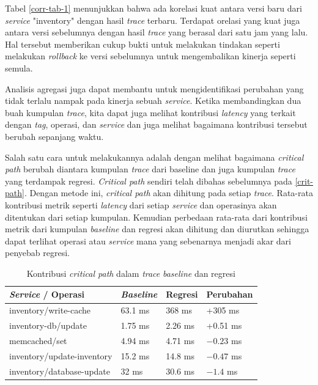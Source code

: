 Tabel \ref{corr-tab-1} menunjukkan bahwa ada korelasi kuat antara versi baru dari \textit{service} "inventory" dengan hasil \textit{trace} terbaru. Terdapat orelasi yang kuat juga antara versi sebelumnya dengan hasil \textit{trace} yang berasal dari satu jam yang lalu. Hal tersebut memberikan cukup bukti untuk melakukan tindakan seperti melakukan \textit{rollback} ke versi sebelumnya untuk mengembalikan kinerja seperti semula.

Analisis agregasi juga dapat membantu untuk mengidentifikasi perubahan yang tidak terlalu nampak pada kinerja sebuah \textit{service}. Ketika membandingkan dua buah kumpulan \textit{trace}, kita dapat juga melihat kontribusi \textit{latency} yang terkait dengan \textit{tag}, operasi, dan \textit{service} dan juga melihat bagaimana kontribusi tersebut berubah sepanjang waktu.

Salah satu cara untuk melakukannya adalah dengan melihat bagaimana \textit{critical path} berubah diantara kumpulan \textit{trace} dari baseline dan juga kumpulan \textit{trace} yang terdampak regresi. \textit{Critical path} sendiri telah dibahas sebelumnya pada \ref{crit-path}. Dengan metode ini, \textit{critical path} akan dihitung pada setiap \textit{trace}. Rata-rata kontribusi metrik seperti \textit{latency} dari setiap \textit{service} dan operasinya akan ditentukan dari setiap kumpulan. Kemudian perbedaan rata-rata dari kontribusi metrik dari kumpulan \textit{baseline} dan regresi akan dihitung dan diurutkan sehingga dapat terlihat operasi atau \textit{service} mana yang sebenarnya menjadi akar dari penyebab regresi.

\begin{small}
	\begin{longtable}{ | p{5cm} | p{2cm} | p{2cm} | p{2cm} | }
		\caption{Kontribusi \textit{critical path} dalam \textit{trace} \textit{baseline} dan regresi}
		\label{corr-tab-2}                                                           
		\\ \hline
		\centering\bfseries{\textit{Service} / Operasi} & \centering\bfseries{\textit{Baseline}} & \centering\bfseries{Regresi} & \centering\bfseries{Perubahan} \tabularnewline \hline
		\endfirsthead
		inventory/write-cache & 63.1 ms & 368 ms & +305 ms \\ \hline
		inventory-db/update & 1.75 ms & 2.26 ms & +0.51 ms \\ \hline
		memcached/set & 4.94 ms & 4.71 ms & $\num{-0.23}$ ms \\ \hline
		inventory/update-inventory & 15.2 ms & 14.8 ms & $\num{-0.47}$ ms \\ \hline
		inventory/database-update & 32 ms & 30.6 ms & $\num{-1.4}$ ms \\ \hline
	\end{longtable}
\end{small}

